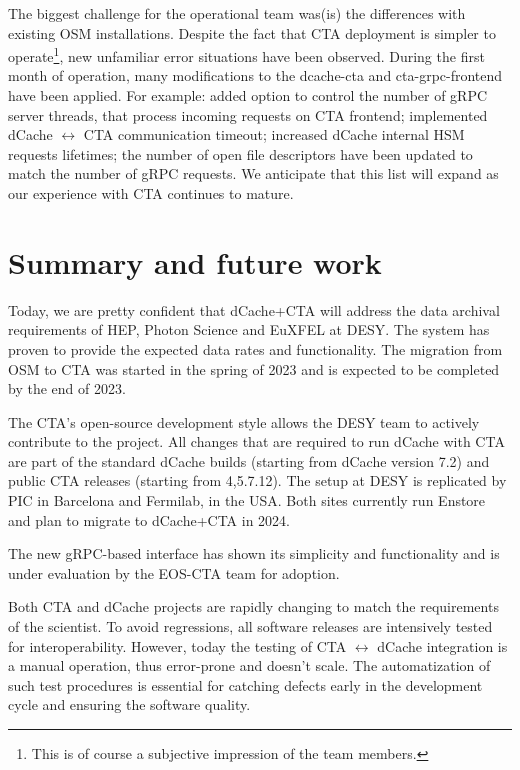 \documentclass{webofc}
\begin{document}
The biggest challenge for the operational team was(is) the differences with existing OSM installations. Despite the fact that CTA deployment is simpler to operate\footnote{This is of course a subjective impression of the team members.}, new unfamiliar error situations have been observed. During the first month of operation, many modifications to the dcache-cta and cta-grpc-frontend have been applied. For example: added option to control the number of gRPC server threads, that process incoming requests on CTA frontend; implemented dCache $\leftrightarrow$ CTA communication timeout; increased dCache internal HSM requests lifetimes; the number of open file descriptors have been updated to match the number of gRPC requests. We anticipate that this list will expand as our experience with CTA continues to mature.


\section{Summary and future work}
\label{summary}

Today, we are pretty confident that dCache+CTA will address the data archival requirements of HEP, Photon Science and EuXFEL at DESY. The system has proven to provide the expected data rates and functionality. The migration from OSM to CTA was started in the spring of 2023 and is expected to be completed by the end of 2023.

The CTA's open-source development style allows the DESY team to actively contribute to the project. All changes that are required to run dCache with CTA are part of the standard dCache builds (starting from dCache version 7.2) and public CTA releases (starting from {4,5}.7.12). The setup at DESY is replicated by PIC in Barcelona and Fermilab, in the USA. Both sites currently run Enstore\cite{enstore} and plan to migrate to dCache+CTA in 2024.
 
The new gRPC-based interface has shown its simplicity and functionality and is under evaluation by the EOS-CTA team for adoption.

Both CTA and dCache projects are rapidly changing to match the requirements of the scientist. To avoid regressions, all software releases are intensively tested for interoperability. However, today the testing of CTA $\leftrightarrow$ dCache integration is a manual operation, thus error-prone and doesn't scale. The automatization of such test procedures is essential for catching defects early in the development cycle and ensuring the software quality.


\end{document}
